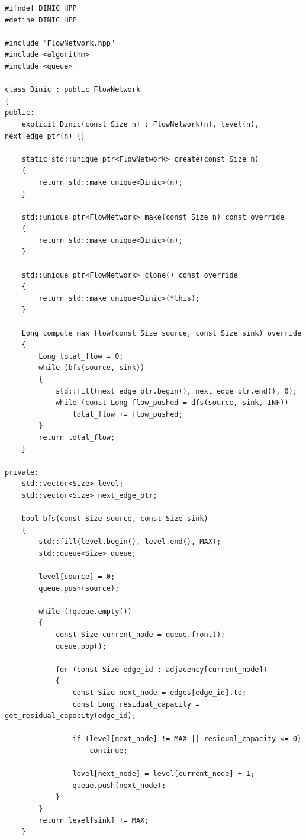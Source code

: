 \newpage

\label{ap:dinic}

\begin{lstlisting}[caption={Implementação em C++ da classe \lstinline{Dinic}, estruturada com Digrafo de Níveis e otimização de ponteiros mortos no cálculo do fluxo bloqueador.}, label={lst:dinic}]
#ifndef DINIC_HPP
#define DINIC_HPP

#include "FlowNetwork.hpp"
#include <algorithm>
#include <queue>

class Dinic : public FlowNetwork
{
public:
	explicit Dinic(const Size n) : FlowNetwork(n), level(n), next_edge_ptr(n) {}

	static std::unique_ptr<FlowNetwork> create(const Size n)
	{
		return std::make_unique<Dinic>(n);
	}

	std::unique_ptr<FlowNetwork> make(const Size n) const override
	{
		return std::make_unique<Dinic>(n);
	}

	std::unique_ptr<FlowNetwork> clone() const override
	{
		return std::make_unique<Dinic>(*this);
	}

	Long compute_max_flow(const Size source, const Size sink) override
	{
		Long total_flow = 0;
		while (bfs(source, sink))
		{
			std::fill(next_edge_ptr.begin(), next_edge_ptr.end(), 0);
			while (const Long flow_pushed = dfs(source, sink, INF))
				total_flow += flow_pushed;
		}
		return total_flow;
	}

private:
	std::vector<Size> level;
	std::vector<Size> next_edge_ptr;

	bool bfs(const Size source, const Size sink)
	{
		std::fill(level.begin(), level.end(), MAX);
		std::queue<Size> queue;

		level[source] = 0;
		queue.push(source);

		while (!queue.empty())
		{
			const Size current_node = queue.front();
			queue.pop();

			for (const Size edge_id : adjacency[current_node])
			{
				const Size next_node = edges[edge_id].to;
				const Long residual_capacity = get_residual_capacity(edge_id);

				if (level[next_node] != MAX || residual_capacity <= 0)
					continue;

				level[next_node] = level[current_node] + 1;
				queue.push(next_node);
			}
		}
		return level[sink] != MAX;
	}


\end{lstlisting}
